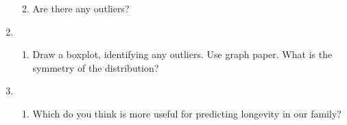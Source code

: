 \documentclass[
  letterpaper,
  DIV=11,
  numbers=noendperiod]{scrartcl}
\providecommand{\tightlist}{%
  \setlength{\itemsep}{0pt}\setlength{\parskip}{0pt}}\usepackage{longtable,booktabs,array}
\begin{document}
\begin{enumerate}
\begin{enumerate}
  \def\labelenumii{(\arabic{enumii})}
  \setcounter{enumii}{5}
  \tightlist
  \item
    Are there any outliers?
  \end{enumerate}
\item
  \begin{enumerate}
  \def\labelenumii{(\arabic{enumii})}
  \setcounter{enumii}{5}
  \tightlist
  \item
    Draw a boxplot, identifying any outliers. Use graph paper. What is
    the symmetry of the distribution?\\
  \end{enumerate}
\item
  \begin{enumerate}
  \def\labelenumii{(\arabic{enumii})}
  \setcounter{enumii}{1}
  \tightlist
  \item
    Which do you think is more useful for predicting longevity in our
    family?
  \end{enumerate}
\end{enumerate}
\end{document}
